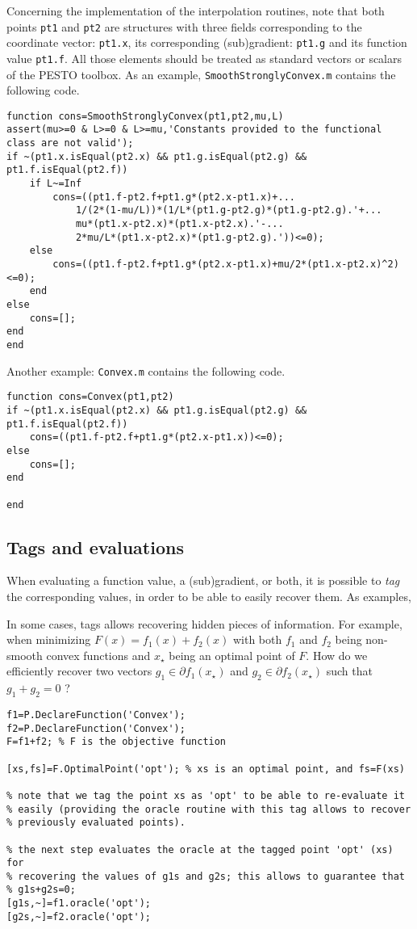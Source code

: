 \documentclass[11pt,a4paper]{article}
\begin{document}
Concerning the implementation of the interpolation routines, note that both points \verb?pt1? and \verb?pt2? are structures with three fields corresponding to the coordinate vector: \verb?pt1.x?, its corresponding (sub)gradient: \verb?pt1.g? and its function value \verb?pt1.f?. All those elements should be treated as standard vectors or scalars of the PESTO toolbox. As an example, \verb?SmoothStronglyConvex.m? contains the following code.\\[-1cm]

\begin{lstlisting}
function cons=SmoothStronglyConvex(pt1,pt2,mu,L)
assert(mu>=0 & L>=0 & L>=mu,'Constants provided to the functional class are not valid');
if ~(pt1.x.isEqual(pt2.x) && pt1.g.isEqual(pt2.g) && pt1.f.isEqual(pt2.f))
    if L~=Inf
        cons=((pt1.f-pt2.f+pt1.g*(pt2.x-pt1.x)+...
            1/(2*(1-mu/L))*(1/L*(pt1.g-pt2.g)*(pt1.g-pt2.g).'+...
            mu*(pt1.x-pt2.x)*(pt1.x-pt2.x).'-...
            2*mu/L*(pt1.x-pt2.x)*(pt1.g-pt2.g).'))<=0);
    else
        cons=((pt1.f-pt2.f+pt1.g*(pt2.x-pt1.x)+mu/2*(pt1.x-pt2.x)^2)<=0);
    end    
else
    cons=[];
end
end
\end{lstlisting}

Another example: \verb?Convex.m? contains the following code.\\[-1cm]
\begin{lstlisting}
function cons=Convex(pt1,pt2)
if ~(pt1.x.isEqual(pt2.x) && pt1.g.isEqual(pt2.g) && pt1.f.isEqual(pt2.f))
    cons=((pt1.f-pt2.f+pt1.g*(pt2.x-pt1.x))<=0);
else
    cons=[];
end

end
\end{lstlisting}
\newpage
\subsection{Tags and evaluations}
When evaluating a function value, a (sub)gradient, or both, it is possible to \emph{tag} the corresponding values, in order to be able to easily recover them. As examples,


In some cases, tags allows recovering hidden pieces of information. For example, when minimizing $F(x)=f_1(x)+f_2(x)$ with both $f_1$ and $f_2$ being non-smooth convex functions and $x_\star$ being an optimal point of $F$.  How do we efficiently recover two vectors $g_1\in\partial f_1(x_\star)$ and $g_2\in\partial f_2(x_\star)$ such that $g_1+g_2=0$ ?\\[-1cm]
\begin{lstlisting}
f1=P.DeclareFunction('Convex');
f2=P.DeclareFunction('Convex');
F=f1+f2; % F is the objective function

[xs,fs]=F.OptimalPoint('opt'); % xs is an optimal point, and fs=F(xs)

% note that we tag the point xs as 'opt' to be able to re-evaluate it
% easily (providing the oracle routine with this tag allows to recover
% previously evaluated points).

% the next step evaluates the oracle at the tagged point 'opt' (xs) for
% recovering the values of g1s and g2s; this allows to guarantee that
% g1s+g2s=0;
[g1s,~]=f1.oracle('opt');
[g2s,~]=f2.oracle('opt');
\end{lstlisting}
\end{document}
